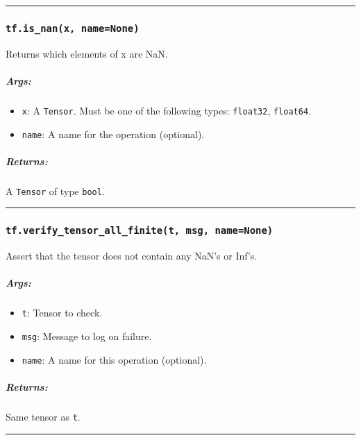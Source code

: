 \begin{center}\rule{0.5\linewidth}{\linethickness}\end{center}

\subsubsection{\texorpdfstring{\texttt{tf.is\_nan(x,\ name=None)}
}{tf.is\_nan(x, name=None) }}\label{tf.isux5fnanx-namenone}

Returns which elements of x are NaN.

\subparagraph{Args: }\label{args-18}

\begin{itemize}
\tightlist
\item
  \texttt{x}: A \texttt{Tensor}. Must be one of the following types:
  \texttt{float32}, \texttt{float64}.
\item
  \texttt{name}: A name for the operation (optional).
\end{itemize}

\subparagraph{Returns: }\label{returns-18}

A \texttt{Tensor} of type \texttt{bool}.

\begin{center}\rule{0.5\linewidth}{\linethickness}\end{center}

\subsubsection{\texorpdfstring{\texttt{tf.verify\_tensor\_all\_finite(t,\ msg,\ name=None)}
}{tf.verify\_tensor\_all\_finite(t, msg, name=None) }}\label{tf.verifyux5ftensorux5fallux5ffinitet-msg-namenone}

Assert that the tensor does not contain any NaN's or Inf's.

\subparagraph{Args: }\label{args-19}

\begin{itemize}
\tightlist
\item
  \texttt{t}: Tensor to check.
\item
  \texttt{msg}: Message to log on failure.
\item
  \texttt{name}: A name for this operation (optional).
\end{itemize}

\subparagraph{Returns: }\label{returns-19}

Same tensor as \texttt{t}.

\begin{center}\rule{0.5\linewidth}{\linethickness}\end{center}

